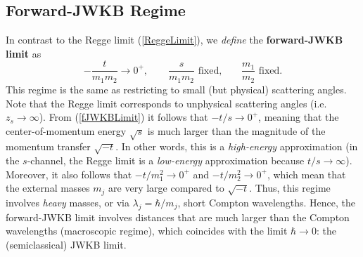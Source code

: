 \subsection{Forward-JWKB Regime}
In contrast to the Regge limit (\ref{ReggeLimit}), we \textit{define} the \textbf{forward-JWKB limit} as
\begin{equation}
	{-\frac{t}{m_{1} m_{2}}} \rightarrow 0^{+}, \qquad \frac{s}{m_{1} m_{2}} \text{ fixed,} \qquad \frac{m_{1}}{m_{2}} \text{ fixed.} \label{fJWKBLimit}
\end{equation}
This regime is the same as restricting to small (but physical) scattering angles. Note that the Regge limit corresponds to unphysical scattering angles (i.e. $z_{s} \rightarrow \infty$). From (\ref{fJWKBLimit}) it follows that $-t/s \rightarrow 0^{+}$, meaning that the center-of-momentum energy $\sqrt{s}$ is much larger than the magnitude of the momentum transfer $\sqrt{-t}$. In other words, this is a \textit{high-energy} approximation (in the $s$-channel, the Regge limit is a \textit{low-energy} approximation because $t/s \rightarrow \infty$). Moreover, it also follows that $-t/m_{1}^{2} \rightarrow 0^{+}$ and $-t/m_{2}^{2} \rightarrow 0^{+}$, which mean that the external masses $m_{j}$ are very large compared to $\sqrt{-t}$. Thus, this regime involves \textit{heavy} masses, or via $\lambda_{j} = \hbar / m_{j}$, short Compton wavelengths. Hence, the forward-JWKB limit involves distances that are much larger than the Compton wavelengths (macroscopic regime), which coincides with the limit $\hbar \rightarrow 0$: the (semiclassical) JWKB limit.

